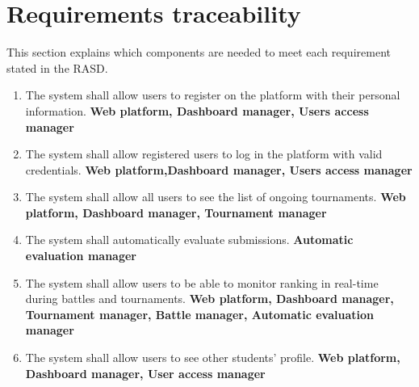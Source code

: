 \chapter{Requirements traceability}
This section explains which components are needed to meet each requirement stated in the RASD. 

\begin{enumerate}[label=\textbf{R.\arabic*}]
    \subsubsection*{Users}
    \item {} {The system shall allow users to register on the platform with their personal information.} \newline
    \textbf{Web platform, Dashboard manager, Users access manager}
    \item {} {The system shall allow registered users to log in the platform with valid credentials.} \newline
    \textbf{Web platform,Dashboard manager, Users access manager}
    \item {} {The system shall allow all users to see the list of ongoing tournaments.} \newline
    \textbf{Web platform, Dashboard manager, Tournament manager}
    \item {} {The system shall automatically evaluate submissions.}
    \textbf{Automatic evaluation manager} 
    \item {} {The system shall allow users to be able to monitor ranking in real-time during battles and tournaments.} \newline
    \textbf{Web platform, Dashboard manager, Tournament manager, Battle manager, Automatic evaluation manager} 
    \item {} {The system shall allow users to see other students' profile.} \newline
    \textbf{Web platform, Dashboard manager, User access manager}
    

\end{enumerate}

